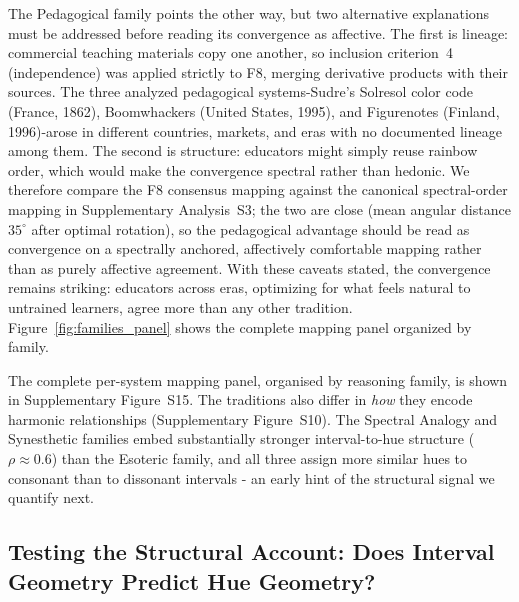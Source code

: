 \documentclass[12pt]{article}
\begin{document}
The Pedagogical family points the other way, but two alternative
explanations must be addressed before reading its convergence as
affective. The first is lineage: commercial teaching materials copy one
another, so inclusion criterion~4 (independence) was applied strictly
to F8, merging derivative products with their sources. The three
analyzed pedagogical systems-Sudre's Solresol color code (France,
1862), Boomwhackers (United States, 1995), and Figurenotes (Finland,
1996)-arose in different countries, markets, and eras with no
documented lineage among them.
The second is structure: educators might simply reuse rainbow order,
which would make the convergence spectral rather than hedonic. We
therefore compare the F8 consensus mapping against the canonical
spectral-order mapping in Supplementary Analysis~S3; the two are close
(mean angular distance $35^\circ$ after optimal rotation), so the
pedagogical advantage should be read as convergence
on a spectrally anchored, affectively comfortable mapping rather than
as purely affective agreement. With these caveats stated, the
convergence remains striking: educators across eras, optimizing for
what feels natural to untrained learners, agree more than any other
tradition. Figure~\ref{fig:families_panel} shows the complete mapping
panel organized by family.

The complete per-system mapping panel, organised by reasoning family,
is shown in Supplementary Figure~S15. The traditions also differ in \emph{how} they encode harmonic
relationships (Supplementary Figure~S10). The Spectral Analogy and Synesthetic
families embed substantially stronger interval-to-hue structure
($\rho \approx 0.6$) than the Esoteric family, and all three assign more
similar hues to consonant than to dissonant intervals - an early hint of
the structural signal we quantify next.


\subsection{Testing the Structural Account: Does Interval Geometry
Predict Hue Geometry?}
\end{document}

